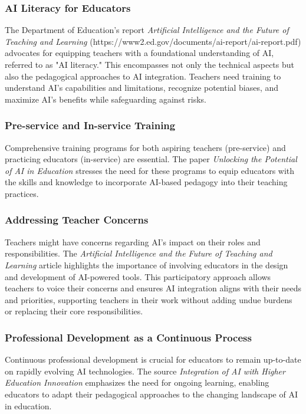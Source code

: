 \documentclass{article}
\begin{document}
\subsubsection{AI Literacy for Educators}

The Department of Education's report \textit{Artificial Intelligence and the Future of Teaching and Learning} (https://www2.ed.gov/documents/ai-report/ai-report.pdf) advocates for equipping teachers with a foundational understanding of AI, referred to as "AI literacy." This encompasses not only the technical aspects but also the pedagogical approaches to AI integration. Teachers need training to understand AI's capabilities and limitations, recognize potential biases, and maximize AI's benefits while safeguarding against risks.

\subsubsection{Pre-service and In-service Training}

Comprehensive training programs for both aspiring teachers (pre-service) and practicing educators (in-service) are essential. The paper \textit{Unlocking the Potential of AI in Education} \cite{Rashmi2023Unlocking} stresses the need for these programs to equip educators with the skills and knowledge to incorporate AI-based pedagogy into their teaching practices.

\subsubsection{Addressing Teacher Concerns}

Teachers might have concerns regarding AI's impact on their roles and responsibilities. The \textit{Artificial Intelligence and the Future of Teaching and Learning} article highlights the importance of involving educators in the design and development of AI-powered tools. This participatory approach allows teachers to voice their concerns and ensures AI integration aligns with their needs and priorities, supporting teachers in their work without adding undue burdens or replacing their core responsibilities.

\subsubsection{Professional Development as a Continuous Process}

Continuous professional development is crucial for educators to remain up-to-date on rapidly evolving AI technologies. The source \textit{Integration of AI with Higher Education Innovation}\cite{Shi2023IntegrationOA} emphasizes the need for ongoing learning, enabling educators to adapt their pedagogical approaches to the changing landscape of AI in education.
\end{document}
